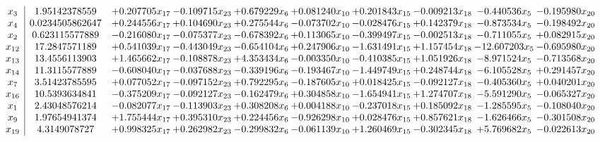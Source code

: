 \documentclass[10pt]{article}
\begin{document}
 \[\begin{array}{c| c c@{\hskip 2pt} c@{\hskip 2pt} c@{\hskip 2pt} c@{\hskip 2pt} c@{\hskip 2pt} c@{\hskip 2pt} c@{\hskip 2pt} c@{\hskip 2pt} }
 x_{3}   &  1.95142378559 & + 0.207705 x_{17} & -0.109715 x_{23} & + 0.679229 x_{6} & + 0.081240 x_{10} & + 0.201843 x_{15} & -0.009213 x_{18} & -0.440536 x_{5} & -0.195980 x_{20}\\
 x_{4}   &  0.0234505862647 & + 0.244556 x_{17} & + 0.104690 x_{23} & + 0.275544 x_{6} & -0.073702 x_{10} & -0.028476 x_{15} & + 0.142379 x_{18} & -0.873534 x_{5} & -0.198492 x_{20}\\
 x_{2}   &  0.623115577889 & -0.216080 x_{17} & -0.075377 x_{23} & -0.678392 x_{6} & + 0.113065 x_{10} & -0.399497 x_{15} & -0.002513 x_{18} & -0.711055 x_{5} & + 0.082915 x_{20}\\
 x_{12}   &  17.2847571189 & + 0.541039 x_{17} & -0.443049 x_{23} & -0.654104 x_{6} & + 0.247906 x_{10} & -1.631491 x_{15} & + 1.157454 x_{18} & -12.607203 x_{5} & -0.695980 x_{20}\\
 x_{13}   &  13.4556113903 & + 1.465662 x_{17} & -0.108878 x_{23} & + 4.353434 x_{6} & -0.003350 x_{10} & -0.410385 x_{15} & + 1.051926 x_{18} & -8.971524 x_{5} & -0.713568 x_{20}\\
 x_{14}   &  11.3115577889 & -0.608040 x_{17} & -0.037688 x_{23} & -0.339196 x_{6} & -0.193467 x_{10} & -1.449749 x_{15} & + 0.248744 x_{18} & -6.105528 x_{5} & + 0.291457 x_{20}\\
 x_{7}   &  3.51423785595 & + 0.077052 x_{17} & -0.097152 x_{23} & + 0.792295 x_{6} & -0.187605 x_{10} & + 0.018425 x_{15} & -0.092127 x_{18} & -0.405360 x_{5} & + 0.040201 x_{20}\\
 x_{16}   &  10.5393634841 & -0.375209 x_{17} & -0.092127 x_{23} & -0.162479 x_{6} & + 0.304858 x_{10} & -1.654941 x_{15} & + 1.274707 x_{18} & -5.591290 x_{5} & -0.065327 x_{20}\\
 x_{1}   &  2.43048576214 & -0.082077 x_{17} & -0.113903 x_{23} & + 0.308208 x_{6} & + 0.004188 x_{10} & -0.237018 x_{15} & + 0.185092 x_{18} & -1.285595 x_{5} & -0.108040 x_{20}\\
 x_{9}   &  1.97654941374 & + 1.755444 x_{17} & + 0.395310 x_{23} & + 0.224456 x_{6} & -0.926298 x_{10} & + 0.028476 x_{15} & + 0.857621 x_{18} & -1.626466 x_{5} & -0.301508 x_{20}\\
 x_{19}   &  4.3149078727 & + 0.998325 x_{17} & + 0.262982 x_{23} & -0.299832 x_{6} & -0.061139 x_{10} & + 1.260469 x_{15} & -0.302345 x_{18} & + 5.769682 x_{5} & -0.022613 x_{20}\\

\end{array}\]
\end{document}
